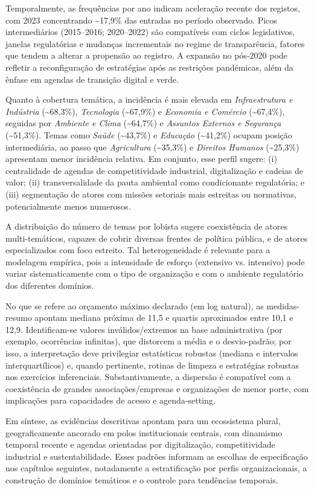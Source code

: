 Temporalmente, as frequências por ano indicam aceleração recente dos registos, com 2023 concentrando \textasciitilde17,9\% das entradas no período observado. Picos intermediários (2015--2016; 2020--2022) são compatíveis com ciclos legislativos, janelas regulatórias e mudanças incrementais no regime de transparência, fatores que tendem a alterar a propensão ao registro. A expansão no pós-2020 pode refletir a reconfiguração de estratégias após as restrições pandémicas, além da ênfase em agendas de transição digital e verde.

Quanto à cobertura temática, a incidência é mais elevada em \textit{Infraestrutura e Indústria} (\textasciitilde68,3\%), \textit{Tecnologia} (\textasciitilde67,9\%) e \textit{Economia e Comércio} (\textasciitilde67,4\%), seguidas por \textit{Ambiente e Clima} (\textasciitilde64,7\%) e \textit{Assuntos Externos e Segurança} (\textasciitilde51,3\%). Temas como \textit{Saúde} (\textasciitilde43,7\%) e \textit{Educação} (\textasciitilde41,2\%) ocupam posição intermediária, ao passo que \textit{Agricultura} (\textasciitilde35,3\%) e \textit{Direitos Humanos} (\textasciitilde25,3\%) apresentam menor incidência relativa. Em conjunto, esse perfil sugere: (i) centralidade de agendas de competitividade industrial, digitalização e cadeias de valor; (ii) transversalidade da pauta ambiental como condicionante regulatória; e (iii) segmentação de atores com missões setoriais mais estreitas ou normativas, potencialmente menos numerosos.

A distribuição do número de temas por lobista sugere coexistência de atores multi-temáticos, capazes de cobrir diversas frentes de política pública, e de atores especializados com foco estreito. Tal heterogeneidade é relevante para a modelagem empírica, pois a intensidade de esforço (extensivo vs. intensivo) pode variar sistematicamente com o tipo de organização e com o ambiente regulatório dos diferentes domínios.

No que se refere ao orçamento máximo declarado (em log natural), as medidas-resumo apontam mediana próxima de 11,5 e quartis aproximados entre 10,1 e 12,9. Identificam-se valores inválidos/extremos na base administrativa (por exemplo, ocorrências infinitas), que distorcem a média e o desvio-padrão; por isso, a interpretação deve privilegiar estatísticas robustas (mediana e intervalos interquartílicos) e, quando pertinente, rotinas de limpeza e estratégias robustas nos exercícios inferenciais. Substantivamente, a dispersão é compatível com a coexistência de grandes associações/empresas e organizações de menor porte, com implicações para capacidades de acesso e agenda-setting.

Em síntese, as evidências descritivas apontam para um ecossistema plural, geograficamente ancorado em polos institucionais centrais, com dinamismo temporal recente e agendas orientadas por digitalização, competitividade industrial e sustentabilidade. Esses padrões informam as escolhas de especificação nos capítulos seguintes, notadamente a estratificação por perfis organizacionais, a construção de domínios temáticos e o controle para tendências temporais.

